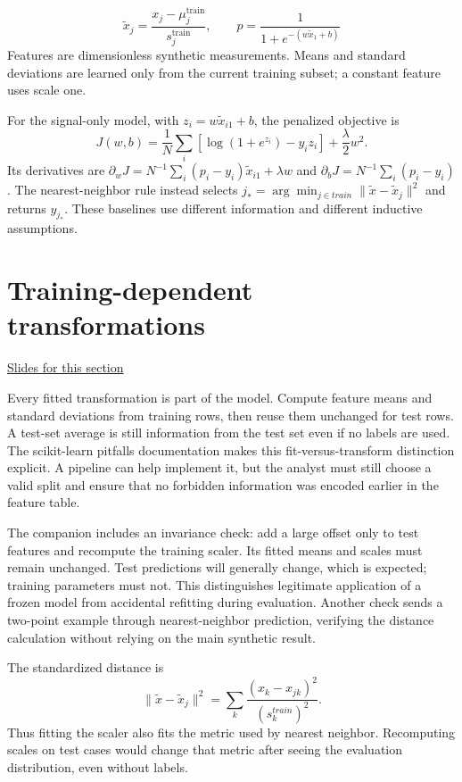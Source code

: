 \documentclass[11pt,letterpaper]{article}
\theoremstyle{definition}\newtheorem{definition}{Definition}\newtheorem{example}{Example}
\numberwithin{equation}{section}
\begin{document}
\[
\widetilde{x}_j=\frac{x_j-\mu_j^{\mathrm{train}}}{s_j^{\mathrm{train}}},\qquad p=\frac{1}{1+e^{-(w\widetilde{x}_1+b)}}
\]
Features are dimensionless synthetic measurements. Means and standard deviations are learned only from the current training subset; a constant feature uses scale one.

For the signal-only model, with $z_i=w\widetilde x_{i1}+b$, the penalized objective is
\[
 J(w,b)=\frac1N\sum_i[\log(1+e^{z_i})-y_i z_i]+\frac\lambda2w^2.
\]
Its derivatives are $\partial_wJ=N^{-1}\sum_i(p_i-y_i)\widetilde x_{i1}+\lambda w$ and $\partial_bJ=N^{-1}\sum_i(p_i-y_i)$. The nearest-neighbor rule instead selects $j_* =\arg\min_{j\in train}\|\widetilde x-\widetilde x_j\|^2$ and returns $y_{j_*}$. These baselines use different information and different inductive assumptions.
\section{Training-dependent transformations}
\hypertarget{note-training-dependent-transformations}{}\label{note:training-dependent-transformations}
{\small \href{slides.html\#frame=fit-the-coordinate-transformation-on-training-data\&step=1}{Slides for this section}}\par
Every fitted transformation is part of the model. Compute feature means and standard deviations from training rows, then reuse them unchanged for test rows. A test-set average is still information from the test set even if no labels are used. The scikit-learn pitfalls documentation makes this fit-versus-transform distinction explicit. A pipeline can help implement it, but the analyst must still choose a valid split and ensure that no forbidden information was encoded earlier in the feature table.

The companion includes an invariance check: add a large offset only to test features and recompute the training scaler. Its fitted means and scales must remain unchanged. Test predictions will generally change, which is expected; training parameters must not. This distinguishes legitimate application of a frozen model from accidental refitting during evaluation. Another check sends a two-point example through nearest-neighbor prediction, verifying the distance calculation without relying on the main synthetic result.

The standardized distance is
\[
 \|\widetilde x-\widetilde x_j\|^2=
 \sum_k\frac{(x_k-x_{jk})^2}{(s_k^{train})^2}.
\]
Thus fitting the scaler also fits the metric used by nearest neighbor. Recomputing scales on test cases would change that metric after seeing the evaluation distribution, even without labels.
\end{document}
